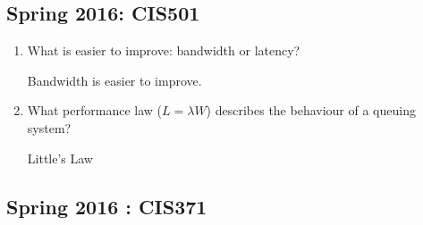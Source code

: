 \documentclass[12pt]{article}
\newenvironment{QandA}{\begin{enumerate}[label=\bfseries\arabic*.]\bfseries}
                      {\end{enumerate}}
\newenvironment{answered}{\par\quad\normalfont}{}
\begin{document}
\subsection{Spring 2016: CIS501}

\begin{QandA}
   \item What is easier to improve: bandwidth or latency?
        \begin{answered}
        Bandwidth is easier to improve.
        \end{answered}
    \item What performance law ($L=\lambda W$) describes the behaviour of a queuing system?
        \begin{answered}
        Little's Law
        \end{answered}
\end{QandA}

\subsection{Spring 2016 : CIS371}
\end{document}
